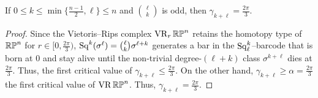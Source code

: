 \medskip\proposition
If $0 \leq k \leq \min\{\frac{n-1}{2}, \ell\} \leq n$ and $\binom{\ell}{k}$ is odd, then $\gamma_{k+\ell} = \tfrac{2\pi}{3}$.

\begin{proof}
	Since the Vietoris--Rips complex $\operatorname{VR}_r\mathbb{RP}^n$ retains the homotopy type of $\mathbb{RP}^n$ for $r \in [0,\tfrac{2\pi}{3})$, $\operatorname{Sq}^k(\sigma^\ell) = \binom{\ell}{k}\sigma^{\ell+k}$ generates a bar in the $\operatorname{Sq}^k_\ell$--barcode that is born at $0$ and stay alive until the non-trivial degree-$(\ell+k)$ class $\sigma^{k+\ell}$ dies at $\tfrac{2\pi}{3}$.
	Thus, the first critical value of $\gamma_{k+\ell} \leq \tfrac{2\pi}{3}$.
	On the other hand, $\gamma_{k+\ell} \geq \alpha = \tfrac{2\pi}{3}$ the first critical value of $\operatorname{VR}\mathbb{RP}^n$.
	Thus, $\gamma_{k+\ell} = \tfrac{2\pi}{3}$.
\end{proof}
